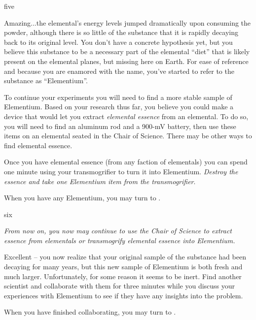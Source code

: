 \documentclass[notebook]{elementals}
\begin{document}
\begin{page}{five}

Amazing...the elemental's energy levels jumped dramatically upon consuming the powder, although there is so little of the substance that it is rapidly decaying back to its original level. You don't have a concrete hypothesis yet, but you believe this substance to be a necessary part of the elemental ``diet'' that is likely present on the elemental planes, but missing here on Earth. For ease of reference and because you are enamored with the name, you've started to refer to the substance as ``Elementium''.

To continue your experiments you will need to find a more stable sample of Elementium. Based on your research thus far, you believe you could make a device that would let you extract \emph{elemental essence} from an elemental. To do so, you will need to find an aluminum rod and a 900-mV battery, then use these items on an elemental seated in the Chair of Science. There may be other ways to find elemental essence.

Once you have elemental essence (from any faction of elementals) you can spend one minute using your transmogrifier to turn it into Elementium. \emph{Destroy the essence and take one Elementium item from the transmogrifier}.

When you have any Elementium, you may turn to .

\end{page}

\begin{page}{six}

\emph{From now on, you now may continue to use the Chair of Science to extract essence from elementals or transmogrify elemental essence into Elementium.}

Excellent -- you now realize that your original sample of the substance had been decaying for many years, but this new sample of Elementium is both fresh and much larger. Unfortunately, for some reason it seems to be inert. Find another scientist and collaborate with them for three minutes while you discuss your experiences with Elementium to see if they have any insights into the problem.

When you have finished collaborating, you may turn to .

\end{page}
\end{document}

